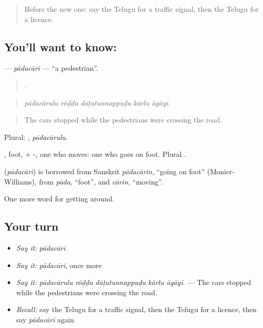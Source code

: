 \label{lesson:TE-C447-padacari}



\begin{quote}
Before the new one: say the Telugu for a traffic signal, then the Telugu for a licence.
\end{quote}

\subsection*{You'll want to know: }
\textbf{} — \emph{pādacāri} — \textquotedblleft{}a pedestrian\textquotedblright{}.

\begin{quote}
    .
\end{quote}

\begin{quote}
\emph{pādacārulu rōḍḍu dāṭutunnappuḍu kārlu āgāyi.}
\end{quote}

\begin{quote}
The cars stopped while the pedestrians were crossing the road.
\end{quote}

Plural: , \emph{pādacārulu}.

, foot, + -, one who moves: one who goes on foot. Plural .

\begin{cousinweb}
\textbf{} (\emph{pādacāri}) is borrowed from Sanskrit \emph{pādacārin}, \textquotedblleft{}going on foot\textquotedblright{} (Monier-Williams), from \emph{pāda}, \textquotedblleft{}foot\textquotedblright{}, and \emph{cārin}, \textquotedblleft{}moving\textquotedblright{}.
\end{cousinweb}

\begin{grammarlens}[title={What you've built}]
One more word for getting around.
\end{grammarlens}

\subsection*{Your turn}
\begin{itemize}
\raggedright
  \item \emph{Say it:} \emph{pādacāri}
  \item \emph{Say it:} \emph{pādacāri}, once more
  \item \emph{Say it:} \emph{pādacārulu rōḍḍu dāṭutunnappuḍu kārlu āgāyi.} — The cars stopped while the pedestrians were crossing the road.
  \item \emph{Recall:} say the Telugu for a traffic signal, then the Telugu for a licence, then say \emph{pādacāri} again
\end{itemize}

